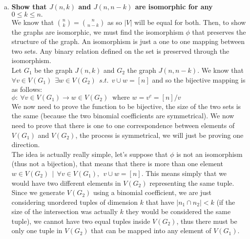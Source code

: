 \begin{enumerate}[a)]
\begin{center}
\end{center} 
    \boldmath
    \item \textbf{Show that $J(n, k)$ and $J(n, n-k)$ are isomorphic for any $0 \leq k \leq n.$} \\ 
    \linebreak 
    \unboldmath
    We know that $\binom{n}{k} = \binom{n}{n-k}$ as so $|V|$ will be equal for both. Then, to show the graphs are isomorphic, we must find the isomorphism $\phi$ that preserves the structure of the graph. An isomorphism is just a one to one mapping between two sets. Any binary relation defined on the set is preserved through the isomorphism.\\
    \linebreak 
    Let $G_1$ be the graph $J(n,k)$ and $G_2$ the graph $J(n, n-k)$. We know that $\forall v \in V(G_1) \:\: \exists w \in V(G_2) \:\: s.t.\:\: v \cup w = [n]$  and so the bijective mapping is as follows: \\
    \linebreak 
    $\phi : \: \forall v \in V(G_1) \rightarrow w \in V(G_2) \: \text{ where } w = v^c = [n]/v $ \\
    \linebreak
    We now need to prove the function to be bijective, the size of the two sets is the same (because the two binomial coefficients are symmetrical). We now need to prove that there is one to one correspondence between elements of $V(G_1)$ and $V(G_2)$, the process is symmetrical, we will just be proving one direction.\\
    \linebreak
    The idea is actually really simple, let's suppose that $\phi$ is not an isomorphism (thus not a bijection), that means that there is more than one element $w \in V(G_2) \:\: | \:\: \forall v \in V(G_1), \:\: v \cup w = [n]$.
    This means simply that we would have two different elements in $V(G_2)$ representing the same tuple. Since we generate $V(G_2)$ using a binomial coefficient, we are just considering unordered tuples of dimension $k$ that have $|n_1 \cap n_2| < k$ (if the size of the intersection was actually $k$ they would be considered the same tuple), we cannot have two equal tuples inside $V(G_2)$, thus there must be only one tuple in $V(G_2)$ that can be mapped into any element of $V(G_1)$.\\

\end{enumerate}
